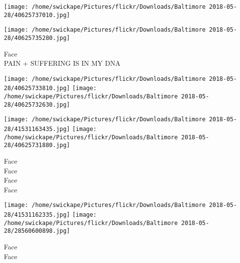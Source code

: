 \documentclass[10pt,letterpaper]{article}
\begin{document}
\texttt{[image: /home/swickape/Pictures/flickr/Downloads/Baltimore 2018-05-28/40625737010.jpg]}

\vspace{0.25in}
\texttt{[image: /home/swickape/Pictures/flickr/Downloads/Baltimore 2018-05-28/40625735280.jpg]}

Face\\
PAIN + SUFFERING IS IN MY DNA\\
\pagebreak

\texttt{[image: /home/swickape/Pictures/flickr/Downloads/Baltimore 2018-05-28/40625733810.jpg]}
\texttt{[image: /home/swickape/Pictures/flickr/Downloads/Baltimore 2018-05-28/40625732630.jpg]}

\texttt{[image: /home/swickape/Pictures/flickr/Downloads/Baltimore 2018-05-28/41531163435.jpg]}
\texttt{[image: /home/swickape/Pictures/flickr/Downloads/Baltimore 2018-05-28/40625731880.jpg]}

Face\\
Face\\
Face\\
Face\\
\pagebreak

\texttt{[image: /home/swickape/Pictures/flickr/Downloads/Baltimore 2018-05-28/41531162335.jpg]}
\texttt{[image: /home/swickape/Pictures/flickr/Downloads/Baltimore 2018-05-28/28560600898.jpg]}

Face\\
Face\\
\pagebreak
\end{document}

